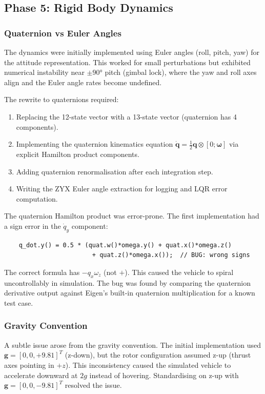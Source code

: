 \documentclass[12pt, a4paper]{article}
\newcommand{\bq}{\bm{q}}
\newcommand{\bomega}{\bm{\omega}}
\begin{document}
\subsection{Phase 5: Rigid Body Dynamics}

\subsubsection{Quaternion vs Euler Angles}

The dynamics were initially implemented using Euler angles (roll, pitch, yaw) for the attitude representation.  This worked for small perturbations but exhibited numerical instability near $\pm 90°$ pitch (gimbal lock), where the yaw and roll axes align and the Euler angle rates become undefined.

The rewrite to quaternions required:
\begin{enumerate}
    \item Replacing the 12-state vector with a 13-state vector (quaternion has 4 components).
    \item Implementing the quaternion kinematics equation $\dot{\bq} = \frac{1}{2} \bq \otimes [0; \bomega]$ via explicit Hamilton product components.
    \item Adding quaternion renormalisation after each integration step.
    \item Writing the ZYX Euler angle extraction for logging and LQR error computation.
\end{enumerate}

The quaternion Hamilton product was error-prone.  The first implementation had a sign error in the $\dot{q}_y$ component:
\begin{verbatim}
    q_dot.y() = 0.5 * (quat.w()*omega.y() + quat.x()*omega.z()
                        + quat.z()*omega.x());  // BUG: wrong signs
\end{verbatim}
The correct formula has $-q_x \omega_z$ (not $+$).  This caused the vehicle to spiral uncontrollably in simulation.  The bug was found by comparing the quaternion derivative output against Eigen's built-in quaternion multiplication for a known test case.

\subsubsection{Gravity Convention}

A subtle issue arose from the gravity convention.  The initial implementation used $\bm{g} = [0, 0, +9.81]^T$ (z-down), but the rotor configuration assumed z-up (thrust axes pointing in $+z$).  This inconsistency caused the simulated vehicle to accelerate downward at $2g$ instead of hovering.  Standardising on z-up with $\bm{g} = [0, 0, -9.81]^T$ resolved the issue.
\end{document}
